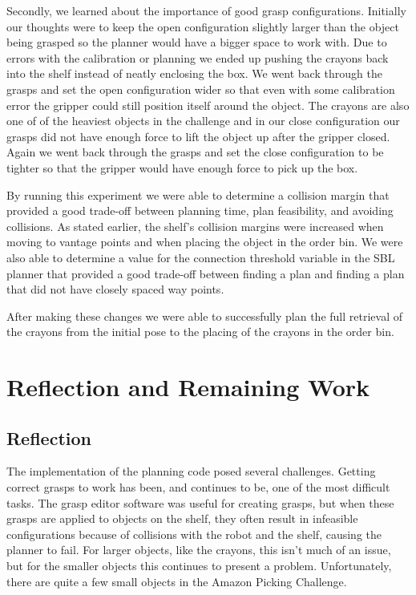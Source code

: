 \documentclass[12pt]{article}
\begin{document}
Secondly, we learned about the importance of good grasp configurations. Initially our thoughts were to keep the open configuration slightly larger than the object being grasped so the planner would have a bigger space to work with. Due to errors with the calibration or planning we ended up pushing the crayons back into the shelf instead of neatly enclosing the box. We went back through the grasps and set the open configuration wider so that even with some calibration error the gripper could still position itself around the object. The crayons are also one of of the heaviest objects in the challenge and in our close configuration our grasps did not have enough force to lift the object up after the gripper closed. Again we went back through the grasps and set the close configuration to be tighter so that the gripper would have enough force to pick up the box.

By running this experiment we were able to determine a collision margin that provided a good trade-off between planning time, plan feasibility, and avoiding collisions. As stated earlier, the shelf's collision margins were increased when moving to vantage points and when placing the object in the order bin. We were also able to determine a value for the connection threshold variable in the SBL planner that provided a good trade-off between finding a plan and finding a plan that did not have closely spaced way points.

After making these changes we were able to successfully plan the full retrieval of the crayons from the initial pose to the placing of the crayons in the order bin.

\section{Reflection and Remaining Work}

\subsection{Reflection}

The implementation of the planning code posed several challenges. Getting correct grasps to work has been, and continues to be, one of the most difficult tasks. The grasp editor software was useful for creating grasps, but when these grasps are applied to objects on the shelf, they often result in infeasible configurations because of collisions with the robot and the shelf, causing the planner to fail. For larger objects, like the crayons, this isn't much of an issue, but for the smaller objects this continues to present a problem. Unfortunately, there are quite a few small objects in the Amazon Picking Challenge.
\end{document}
